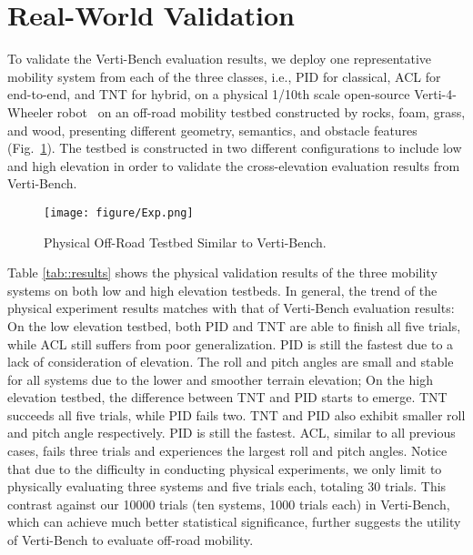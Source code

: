 \section{Real-World Validation}
\label{sec::validation}
To validate the Verti-Bench evaluation results, we deploy one representative mobility system from each of the three classes, i.e., PID for classical, ACL for end-to-end, and TNT for hybrid, on a physical 1/10th scale open-source Verti-4-Wheeler robot~\cite{datar2024toward} on an off-road mobility testbed constructed by rocks, foam, grass, and wood, presenting different geometry, semantics, and obstacle features (Fig.~\ref{fig::real}). The testbed is constructed in two different configurations to include low and high elevation in order to validate the cross-elevation evaluation results from Verti-Bench.  

\begin{figure}[ht]
    \centering
    \texttt{[image: figure/Exp.png]}
    \caption{Physical Off-Road Testbed Similar to Verti-Bench.}
    \label{fig::real}
\end{figure}

Table \ref{tab::results} shows the physical validation results of the three mobility systems on both low and high elevation testbeds. In general, the trend of the physical experiment results matches with that of Verti-Bench evaluation results: On the low elevation testbed, both PID and TNT are able to finish all five trials, while ACL still suffers from poor generalization. PID is still the fastest due to a lack of consideration of elevation. The roll and pitch angles are small and stable for all systems due to the lower and smoother terrain elevation; 
On the high elevation testbed, the difference between TNT and PID starts to emerge. TNT succeeds all five trials, while PID fails two. TNT and PID also exhibit smaller roll and pitch angle respectively. PID is still the fastest. ACL, similar to all previous cases, fails three trials and experiences the largest roll and pitch angles. Notice that due to the difficulty in conducting physical experiments, we only limit to physically evaluating three systems and five trials each, totaling 30 trials. This contrast against our 10000 trials (ten systems, 1000 trials each) in Verti-Bench, which can achieve much better statistical significance, further suggests the utility of Verti-Bench to evaluate off-road mobility. 

